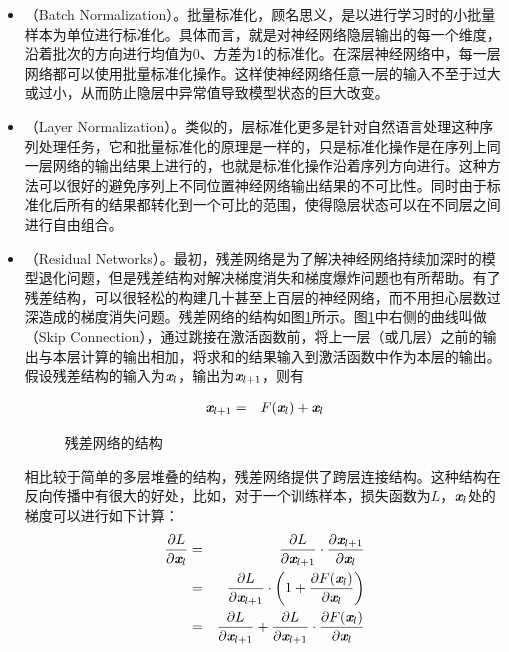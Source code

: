 \begin{itemize}
\item {\small{}}（Batch Normalization）。批量标准化，顾名思义，是以进行学习时的小批量样本为单位进行标准化。具体而言，就是对神经网络隐层输出的每一个维度，沿着批次的方向进行均值为0、方差为1的标准化。在深层神经网络中，每一层网络都可以使用批量标准化操作。这样使神经网络任意一层的输入不至于过大或过小，从而防止隐层中异常值导致模型状态的巨大改变。

\item {\small{}}（Layer Normalization）。类似的，层标准化更多是针对自然语言处理这种序列处理任务，它和批量标准化的原理是一样的，只是标准化操作是在序列上同一层网络的输出结果上进行的，也就是标准化操作沿着序列方向进行。这种方法可以很好的避免序列上不同位置神经网络输出结果的不可比性。同时由于标准化后所有的结果都转化到一个可比的范围，使得隐层状态可以在不同层之间进行自由组合。

\item {\small{}}（Residual Networks）。最初，残差网络是为了解决神经网络持续加深时的模型退化问题，但是残差结构对解决梯度消失和梯度爆炸问题也有所帮助。有了残差结构，可以很轻松的构建几十甚至上百层的神经网络，而不用担心层数过深造成的梯度消失问题。残差网络的结构如图\ref{fig:9-51}所示。图\ref{fig:9-51}中右侧的曲线叫做{\small{}}（Skip Connection），通过跳接在激活函数前，将上一层（或几层）之前的输出与本层计算的输出相加，将求和的结果输入到激活函数中作为本层的输出。假设残差结构的输入为$ {\textbf{\em x}}_l $，输出为$ {\textbf{\em x}}_{l+1} $，则有

\begin{eqnarray}
{\textbf{\em x}}_{l+1}&=&F({\textbf{\em x}}_l)+{\textbf{\em x}}_l
\label{eq:9-44}
\end{eqnarray}


\begin{figure}[htp]
\centering

\caption{残差网络的结构}
\label{fig:9-51}
\end{figure}

相比较于简单的多层堆叠的结构，残差网络提供了跨层连接结构。这种结构在反向传播中有很大的好处，比如，对于一个训练样本，损失函数为$L$，$ \textbf{\em x}_l $处的梯度可以进行如下计算：
\begin{eqnarray}
\frac{\partial L}{\partial {\textbf{\em x}}_l}&=&\frac{\partial L}{\partial {\textbf{\em x}}_{l+1}} \cdot  \frac{\partial {\textbf{\em x}}_{l+1}}{\partial {\textbf{\em x}}_l}\nonumber\\
&=&\frac{\partial L}{\partial {\textbf{\em x}}_{l+1}} \cdot \left(1+\frac{\partial F({\textbf{\em x}}_l)}{\partial {\textbf{\em x}}_l}\right)\nonumber\\
&=&\frac{\partial L}{\partial {\textbf{\em x}}_{l+1}}+\frac{\partial L}{\partial {\textbf{\em x}}_{l+1}} \cdot  \frac{\partial F({\textbf{\em x}}_l)}{\partial {\textbf{\em x}}_l}
\label{eq:9-45}
\end{eqnarray}


\end{itemize}
